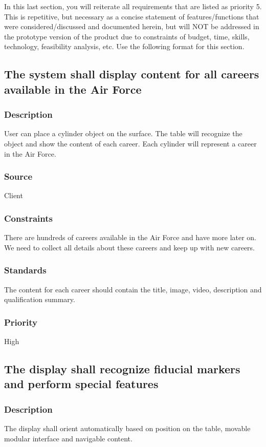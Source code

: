 In this last section, you will reiterate all requirements that are listed as priority 5. This is repetitive, but necessary as a concise statement of features/functions that were considered/discussed and documented herein, but will NOT be addressed in the prototype version of the product due to constraints of budget, time, skills, technology, feasibility analysis, etc. Use the following format for this section.

\subsection{The system shall display content for all careers available in the Air Force}
\subsubsection{Description}
User can place a cylinder object on the surface. The table will recognize the object and show the content of each career. Each cylinder will represent a career in the Air Force.
\subsubsection{Source}
Client
\subsubsection{Constraints}
There are hundreds of careers available in the Air Force and have more later on. We need to collect all details about these careers and keep up with new careers.
\subsubsection{Standards}
The content for each career should contain the title, image, video, description and qualification summary.
\subsubsection{Priority}
High

\subsection{The display shall recognize fiducial markers and perform special features}
\subsubsection{Description}
The display shall orient automatically based on position on the table, movable modular interface and navigable content. 
